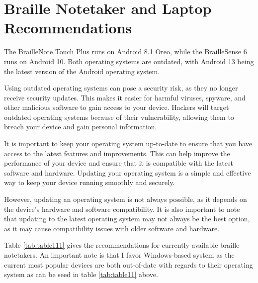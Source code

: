 \hypertarget{braille-notetakers-and-braille-laptop-computers-recommend}{}\section{Braille Notetaker and Laptop Recommendations}\label{braille-notetakers-and-braille-laptop-computers-recommend}
The BrailleNote Touch Plus runs on Android 8.1 Oreo, while the BrailleSense 6 runs on Android 10. Both operating systems are outdated, with Android 13 being the latest version of the Android operating system.

Using outdated operating systems can pose a security risk, as they no longer receive security updates. This makes it easier for harmful viruses, spyware, and other malicious software to gain access to your device. Hackers will target outdated operating systems because of their vulnerability, allowing them to breach your device and gain personal information.

It is important to keep your operating system up-to-date to ensure that you have access to the latest features and improvements. This can help improve the performance of your device and ensure that it is compatible with the latest software and hardware. Updating your operating system is a simple and effective way to keep your device running smoothly and securely.

However, updating an operating system is not always possible, as it depends on the device’s hardware and software compatibility. It is also important to note that updating to the latest operating system may not always be the best option, as it may cause compatibility issues with older software and hardware.

Table \ref{tab:table111} gives the recommendations for currently available braille notetakers. An important note is that I favor Windows-based system as the current most popular devices are both out-of-date with regards to their operating system as can be seed in table \ref{tab:table11} above.

